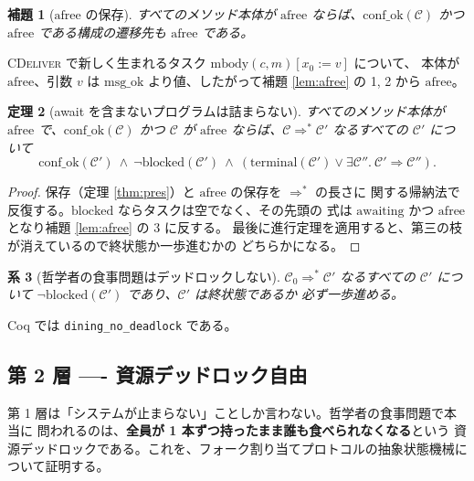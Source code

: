 \documentclass[11pt,a4paper]{ltjsarticle}
\newtheorem{theorem}{定理}
\newtheorem{lemma}[theorem]{補題}
\newtheorem{corollary}[theorem]{系}
\theoremstyle{definition}
\theoremstyle{remark}
\newcommand{\mbody}{\mathrm{mbody}}
\newcommand{\subs}[2]{[#1 := #2]}
\newcommand{\cstep}{\Longrightarrow}
\newcommand{\msgok}{\mathrm{msg\_ok}}
\newcommand{\confok}{\mathrm{conf\_ok}}
\newcommand{\awaiting}{\mathrm{awaiting}}
\begin{document}
\begin{lemma}[$\mathrm{afree}$ の保存]
すべてのメソッド本体が $\mathrm{afree}$ ならば、$\confok(\mathcal{C})$ かつ
$\mathrm{afree}$ である構成の遷移先も $\mathrm{afree}$ である。
\end{lemma}

\textsc{CDeliver} で新しく生まれるタスク $\mbody(c,m)\subs{x_0}{v}$ について、
本体が $\mathrm{afree}$、引数 $v$ は $\msgok$ より値、したがって補題
\ref{lem:afree} の 1, 2 から $\mathrm{afree}$。

\begin{theorem}[await を含まないプログラムは詰まらない]
\label{thm:async}
すべてのメソッド本体が $\mathrm{afree}$ で、$\confok(\mathcal{C})$ かつ
$\mathcal{C}$ が $\mathrm{afree}$ ならば、$\mathcal{C} \cstep^{*} \mathcal{C}'$
なるすべての $\mathcal{C}'$ について
\[
\confok(\mathcal{C}') \ \land\ \lnot\mathrm{blocked}(\mathcal{C}')
\ \land\ (\mathrm{terminal}(\mathcal{C}') \lor
\exists \mathcal{C}''.\ \mathcal{C}' \cstep \mathcal{C}'').
\]
\end{theorem}

\begin{proof}
保存（定理 \ref{thm:pres}）と $\mathrm{afree}$ の保存を $\cstep^{*}$ の長さに
関する帰納法で反復する。$\mathrm{blocked}$ ならタスクは空でなく、その先頭の
式は $\awaiting$ かつ $\mathrm{afree}$ となり補題 \ref{lem:afree} の 3 に反する。
最後に進行定理を適用すると、第三の枝が消えているので終状態か一歩進むかの
どちらかになる。
\end{proof}

\begin{corollary}[哲学者の食事問題はデッドロックしない]
\label{cor:dining}
$\mathcal{C}_0 \cstep^{*} \mathcal{C}'$ なるすべての $\mathcal{C}'$ について
$\lnot\mathrm{blocked}(\mathcal{C}')$ であり、$\mathcal{C}'$ は終状態であるか
必ず一歩進める。
\end{corollary}

Coq では \verb|dining_no_deadlock| である。

\subsection{第 2 層 ---- 資源デッドロック自由}

第 1 層は「システムが止まらない」ことしか言わない。哲学者の食事問題で本当に
問われるのは、\textbf{全員が 1 本ずつ持ったまま誰も食べられなくなる}という
資源デッドロックである。これを、フォーク割り当てプロトコルの抽象状態機械に
ついて証明する。
\end{document}
